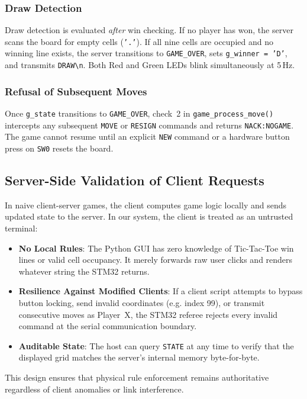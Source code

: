 \subsubsection{Draw Detection}
Draw detection is evaluated \emph{after} win checking.
If no player has won, the server scans the board for empty cells (\texttt{'.'}).
If all nine cells are occupied and no winning line exists, the server transitions to \texttt{GAME\_OVER}, sets \texttt{g\_winner = 'D'}, and transmits \texttt{DRAW\textbackslash n}.
Both Red and Green LEDs blink simultaneously at 5\,Hz.

\subsubsection{Refusal of Subsequent Moves}
Once \texttt{g\_state} transitions to \texttt{GAME\_OVER}, check~2 in \texttt{game\_process\_move()} intercepts any subsequent \texttt{MOVE} or \texttt{RESIGN} commands and returns \texttt{NACK:NOGAME}.
The game cannot resume until an explicit \texttt{NEW} command or a hardware button press on \texttt{SW0} resets the board.

\subsection{Server-Side Validation of Client Requests}

In naive client-server games, the client computes game logic locally and sends updated state to the server.
In our system, the client is treated as an untrusted terminal:
\begin{itemize}
    \item \textbf{No Local Rules}: The Python GUI has zero knowledge of Tic-Tac-Toe win lines or valid cell occupancy. It merely forwards raw user clicks and renders whatever string the STM32 returns.
    \item \textbf{Resilience Against Modified Clients}: If a client script attempts to bypass button locking, send invalid coordinates (e.g. index 99), or transmit consecutive moves as Player~X, the STM32 referee rejects every invalid command at the serial communication boundary.
    \item \textbf{Auditable State}: The host can query \texttt{STATE} at any time to verify that the displayed grid matches the server's internal memory byte-for-byte.
\end{itemize}
This design ensures that physical rule enforcement remains authoritative regardless of client anomalies or link interference.
